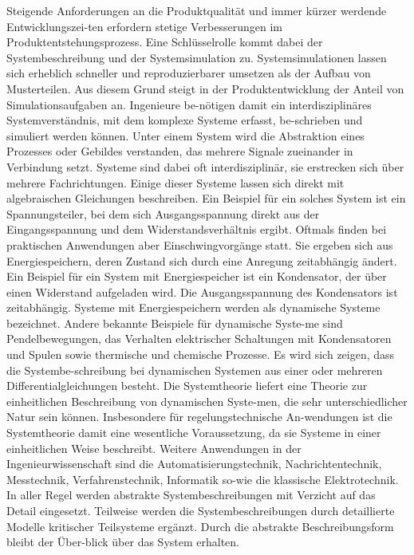 Steigende Anforderungen an die Produktqualität und immer kürzer werdende Entwicklungszei-ten erfordern stetige Verbesserungen im Produktentstehungsprozess. Eine Schlüsselrolle kommt dabei der Systembeschreibung und der Systemsimulation zu. Systemsimulationen lassen sich erheblich schneller und reproduzierbarer umsetzen als der Aufbau von Musterteilen. Aus diesem Grund steigt in der Produktentwicklung der Anteil von Simulationsaufgaben an. Ingenieure be-nötigen damit ein interdisziplinäres Systemverständnis, mit dem komplexe Systeme erfasst, be-schrieben und simuliert werden können.\newline
Unter einem System wird die Abstraktion eines Prozesses oder Gebildes verstanden, das mehrere Signale zueinander in Verbindung setzt. Systeme sind dabei oft interdisziplinär, sie erstrecken sich über mehrere Fachrichtungen. Einige dieser Systeme lassen sich direkt mit algebraischen Gleichungen \newline beschreiben. Ein Beispiel für ein solches System ist ein Spannungsteiler, bei dem sich Ausgangsspannung direkt aus der Eingangsspannung und dem Widerstandsverhältnis ergibt. Oftmals finden bei praktischen Anwendungen aber Einschwingvorgänge statt. Sie ergeben sich aus Energiespeichern, deren Zustand sich durch eine Anregung zeitabhängig ändert. Ein Beispiel für ein System mit Energiespeicher ist ein Kondensator, der über einen Widerstand aufgeladen wird. Die Ausgangsspannung des Kondensators ist zeitabhängig. Systeme mit Energiespeichern werden als dynamische Systeme bezeichnet. Andere bekannte Beispiele für dynamische Syste-me sind Pendelbewegungen, das Verhalten elektrischer Schaltungen mit Kondensatoren und Spulen sowie thermische und chemische Prozesse. Es wird sich zeigen, dass die Systembe-schreibung bei dynamischen Systemen aus einer oder mehreren Differentialgleichungen besteht.\newline
Die Systemtheorie liefert eine Theorie zur einheitlichen Beschreibung von dynamischen Syste-men, die sehr unterschiedlicher Natur sein können. Insbesondere für regelungstechnische An-wendungen ist die Systemtheorie damit eine wesentliche Voraussetzung, da sie Systeme in einer einheitlichen Weise beschreibt. Weitere Anwendungen in der Ingenieurwissenschaft sind die Automatisierungstechnik, Nachrichtentechnik, Messtechnik, Verfahrenstechnik, Informatik so-wie die klassische Elektrotechnik. In aller Regel werden abstrakte Systembeschreibungen mit Verzicht auf das Detail eingesetzt. Teilweise werden die Systembeschreibungen durch detaillierte Modelle kritischer Teilsysteme ergänzt. Durch die abstrakte Beschreibungsform bleibt der Über-blick über das System erhalten. 

